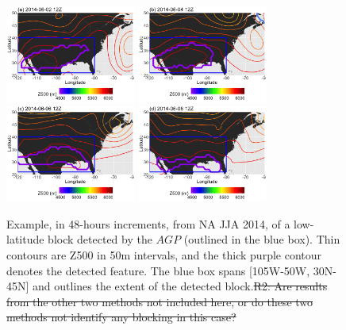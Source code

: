 \documentclass[smallextended]{svjour3}       %
\numberwithin{equation}{section}
\begin{document}
\begin{figure}
\centering
\includegraphics[width=0.38\textwidth]{fig10a}
\includegraphics[width=0.38\textwidth]{fig10b}\\
\includegraphics[width=0.38\textwidth]{fig10c}
\includegraphics[width=0.38\textwidth]{fig10d}
\caption{Example, in 48-hours increments, from NA JJA 2014, of a low-latitude block detected by the $AGP$ (outlined in the blue box). Thin contours are Z500 in 50m intervals, and the thick purple contour denotes the detected feature. The blue box spans [105W-50W, 30N-45N] and outlines the extent of the detected block.{\color{teal}\sout{R2: Are results from the other two methods not included here, or do these two methods not identify any blocking in this case?}}}\label{lowlatjja}
\end{figure} 
\end{document}
